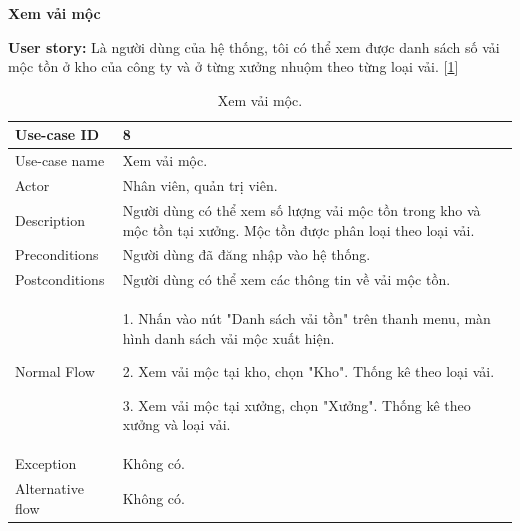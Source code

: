 \newpage
\textbf{Xem vải mộc}\par
\textbf{User story:} Là người dùng của hệ thống, tôi có thể xem được danh sách số vải mộc tồn ở kho của công ty và ở từng xưởng nhuộm theo từng loại vải. [\ref{bang8}]
\begin{table}[!htp]
    \centering
    \begin{tabular}{|m{3cm}|m{10cm}|}
    \hline 
        Use-case ID & 8\\ \hline
        Use-case name & Xem vải mộc.\\ \hline
        Actor & Nhân viên, quản trị viên.\\ \hline
        Description & Người dùng có thể xem số lượng vải mộc tồn trong kho và mộc tồn tại xưởng. Mộc tồn được phân loại theo loại vải.\\ \hline
        Preconditions & Người dùng đã đăng nhập vào hệ thống.\\ \hline
        Postconditions & Người dùng có thể xem các thông tin về vải mộc tồn.\\ \hline
        Normal Flow & 
        1. Nhấn vào nút "Danh sách vải tồn" trên thanh menu, màn hình danh sách vải mộc xuất hiện.\par
        2. Xem vải mộc tại kho, chọn "Kho". Thống kê theo loại vải.\par
        3. Xem vải mộc tại xưởng, chọn "Xưởng". Thống kê theo xưởng và loại vải.
        \\ \hline
        Exception & Không có.\\ \hline
        Alternative flow & Không có.\\ 
    \hline 
    \end{tabular}
    \caption{Xem vải mộc.}
    \label{bang8}
\end{table}

